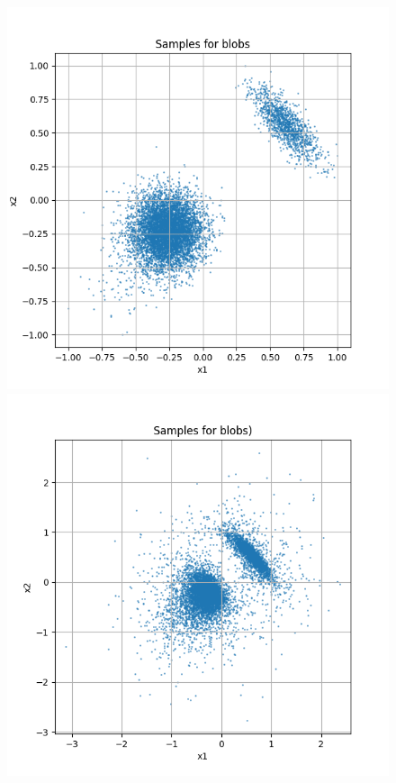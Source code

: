 \documentclass[a4paper,12pt]{article}
\begin{document}
\begin{figure}[H]
  \centering
  \begin{minipage}{0.3\textwidth}
      \centering
      \includegraphics[width=\linewidth]{images/blobs.png}
  \end{minipage}
  \begin{minipage}{0.3\textwidth}
      \centering
      \includegraphics[width=\linewidth]{"images/Samples for ddpm_2_10_0.0001_0.02_blobs.png"}

\end{minipage}
\end{figure}
\end{document}
